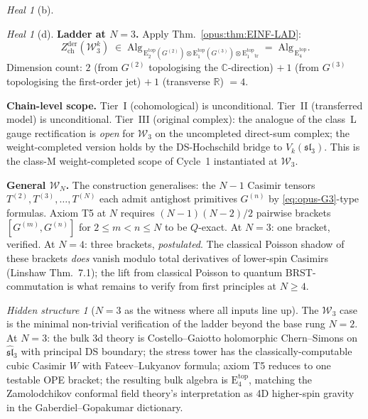 \documentclass{article}
\theoremstyle{definition}
\theoremstyle{remark}
\newtheorem{heal}[theorem]{Heal}
\newtheorem{hidden}[theorem]{Hidden structure}
\newcommand{\Zder}{Z^{\mathrm{der}}_{\mathrm{ch}}}
\newcommand{\Etop}[1]{\mathrm{E}_{#1}^{\mathrm{top}}}
\newcommand{\cW}{\mathcal{W}}
\begin{document}
\begin{heal}[b]
\begin{heal}[d]
\textbf{Ladder at $N=3$.} Apply
Thm.~\ref*{opus:thm:EINF-LAD}:
\begin{equation}\label{eq:opus-W3-ladder}
  \Zder(\cW_3^k) \;\in\;
  \mathrm{Alg}_{\,\Etop{2}(G^{(2)})
    \otimes \Etop{1}(G^{(3)})
    \otimes \Etop{1}_{\mathrm{tr}}}
  \;=\; \mathrm{Alg}_{\,\Etop{4}}.
\end{equation}
Dimension count: $2$ (from $G^{(2)}$ topologising the
$\mathbb{C}$-direction) $+\ 1$ (from $G^{(3)}$ topologising
the first-order jet) $+\ 1$ (transverse $\mathbb{R}$) $= 4$.

\textbf{Chain-level scope.} Tier~I (cohomological) is
unconditional. Tier~II (transferred model) is unconditional.
Tier~III (original complex): the analogue of the class~L
gauge rectification is \emph{open} for $\cW_3$ on the
uncompleted direct-sum complex; the weight-completed
version holds by the DS-Hochschild bridge to
$V_k(\mathfrak{sl}_3)$. This is the class-M weight-completed
scope of Cycle~1 instantiated at $\cW_3$.

\textbf{General $\cW_N$.} The construction generalises: the
$N-1$ Casimir tensors $T^{(2)}, T^{(3)}, \ldots, T^{(N)}$
each admit antighost primitives $G^{(n)}$ by
\eqref{eq:opus-G3}-type formulas. Axiom T5 at $N$ requires
$(N-1)(N-2)/2$ pairwise brackets
$[G^{(m)}, G^{(n)}]$ for $2 \le m < n \le N$ to be
$Q$-exact. At $N=3$: one bracket, verified. At $N=4$: three
brackets, \emph{postulated}. The classical Poisson shadow of
these brackets \emph{does} vanish modulo total derivatives
of lower-spin Casimirs (Linshaw Thm.~7.1); the lift from
classical Poisson to quantum BRST-commutation is what
remains to verify from first principles at $N \ge 4$.

\begin{hidden}[$N=3$ as the witness where all inputs line up]
\label{hidden:cycle4}
The $\cW_3$ case is the minimal non-trivial verification of
the ladder beyond the base rung $N=2$. At $N=3$: the
bulk $3$d theory is Costello--Gaiotto holomorphic
Chern--Simons on $\widehat{\mathfrak{sl}}_3$ with principal
DS boundary; the stress tower has the classically-computable
cubic Casimir $W$ with Fateev--Lukyanov formula; axiom T5
reduces to one testable OPE bracket; the resulting bulk
algebra is $\Etop{4}$, matching the Zamolodchikov conformal
field theory's interpretation as 4D higher-spin gravity in
the Gaberdiel--Gopakumar dictionary.
\end{hidden}
\end{heal}


\end{heal}
\end{document}
